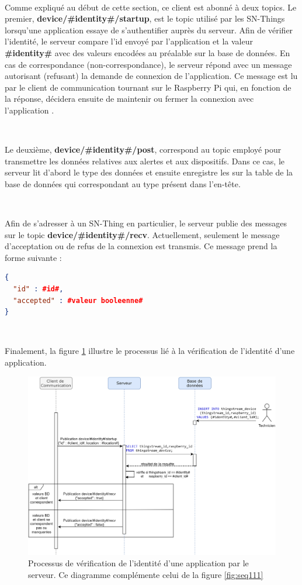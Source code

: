 ~

\noindent
Comme expliqué au début de cette section, ce client est abonné à deux topics. Le premier, \textbf{device/\#identity\#/startup}, est le topic utilisé par les SN-Things lorsqu'une application essaye de s'authentifier auprès du serveur. Afin de vérifier l'identité, le serveur compare l'id envoyé par l'application et la valeur \textbf{\#identity\#} avec des valeurs encodées au préalable sur la base de données. En cas de correspondance (non-correspondance), le serveur répond avec un message autorisant (refusant) la demande de connexion de l'application. Ce message est lu par le client de communication tournant sur le Raspberry Pi qui, en fonction de la réponse, décidera ensuite de maintenir ou fermer la connexion avec l'application .

~

\noindent
Le deuxième, \textbf{device/\#identity\#/post}, correspond au topic employé pour transmettre les données relatives aux alertes et aux dispositifs. Dans ce cas, le serveur lit d'abord le type des données et ensuite enregistre les sur la table de la base de données qui correspondant au type présent dans l'en-tête.

~

\noindent
Afin de s'adresser à un SN-Thing en particulier, le serveur publie des messages sur le topic \textbf{device/\#identity\#/recv}. Actuellement, seulement le message d'acceptation ou de refus de la connexion est transmis. Ce message prend la forme suivante :

\begin{lstlisting}[language=json]
{
  "id" : #id#,
  "accepted" : #valeur booleenne#
}
\end{lstlisting}

~

\noindent
Finalement, la figure \ref{fig:auth_app_server} illustre le processus lié à la vérification de l'identité d'une application.

\begin{figure}[ht!]
  \includegraphics[width=\textwidth]{img/app/verify_identity.png}
  \caption{Processus de vérification de l'identité d'une application par le serveur. Ce diagramme complémente celui de la figure \ref{fig:seq111}}
  \label{fig:auth_app_server}
\end{figure}

